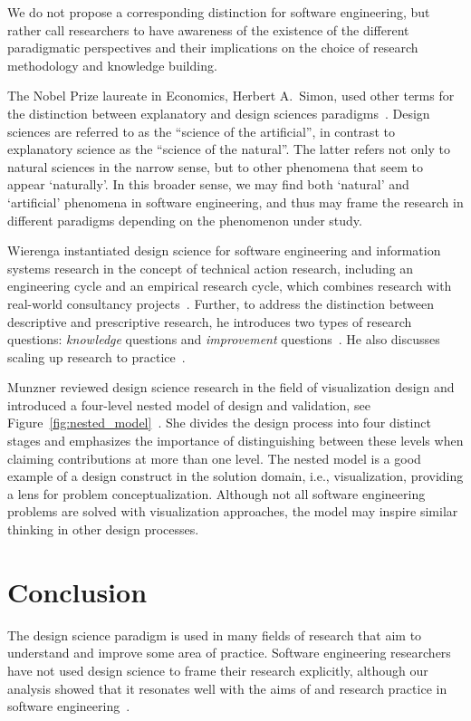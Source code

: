 \documentclass[graybox]{svmult}
\begin{document}
We do not propose a corresponding distinction for software engineering, but rather call researchers to have awareness of the existence of the different paradigmatic perspectives and their implications on the choice of research methodology and knowledge building.

The Nobel Prize laureate in Economics, Herbert A.\ Simon, used other terms for the distinction between explanatory and design sciences paradigms~\cite{Simons69}. Design sciences are referred to as the ``science of the artificial'', in contrast to explanatory science as the ``science of the natural''. The latter refers not only to natural sciences in the narrow sense, but to other phenomena that seem to appear `naturally'. In this broader sense, we may find both `natural' and `artificial' phenomena in software engineering, and thus may frame the research in different paradigms depending on the phenomenon under study. 


Wierenga instantiated design science for software engineering and information systems research in the concept of technical action research, including an engineering cycle and an empirical research cycle, which combines research with real-world consultancy projects~\cite{wieringa_six_2015,wieringa_technical_2012,wieringa_what_2014}. Further, to address the distinction between descriptive and prescriptive research, he introduces two types of research questions: \emph{knowledge} questions and \emph{improvement} questions~\cite{wieringa_design_2009}. He also discusses scaling up research to practice~\cite{Wieringa2014}. 

Munzner reviewed design science research in the field of visualization design and introduced a four-level nested model of design and validation, see Figure~\ref{fig:nested_model}~\cite{munzner2009}. She divides the design process into four distinct stages and emphasizes the importance of distinguishing between these levels when claiming contributions at more than one level. The nested model is a good example of a design construct in the solution domain, i.e., visualization, providing a lens for problem conceptualization. Although not all software engineering problems are solved with visualization approaches, the model may inspire similar thinking in other design processes. 


\section{Conclusion}
\label{sec:conclusion}
The design science paradigm is used in many fields of research that aim to understand and improve some area of practice. Software engineering researchers have not used design science to frame their research explicitly, although our analysis showed that it resonates well with the aims of and research practice in software engineering~\cite{Engstrom19arxiv}. 
\end{document}
